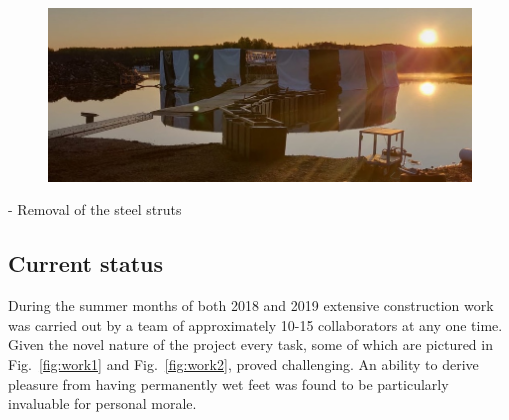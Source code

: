 \begin{figure} %
    \includegraphics[width=\textwidth]{diagrams/4-chips/chips_with_liner_sun.jpeg}
    \caption[dfsdg]
    {\chipsfive}
    \label{fig:chips_with_liner}
\end{figure}

- Removal of the steel struts

\subsection{Current status} %
\label{sec:chips_detector_status} %

During the summer months of both 2018 and 2019 extensive \chipsfive construction work was carried
out by a team of approximately 10-15 collaborators at any one time. Given the novel nature of the
project every task, some of which are pictured in Fig.~\ref{fig:work1} and Fig.~\ref{fig:work2},
proved challenging. An ability to derive pleasure from having permanently wet feet was found to be
particularly invaluable for personal morale.

